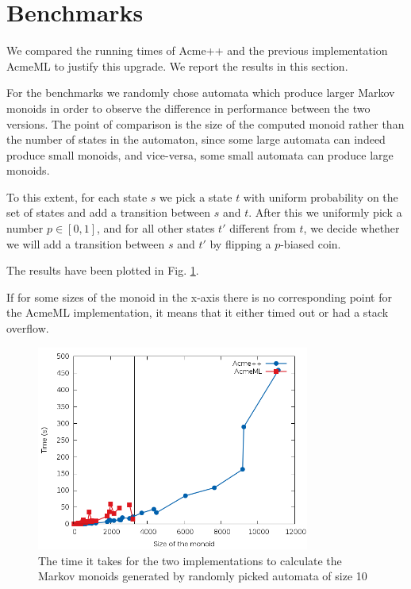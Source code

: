 \section{Benchmarks}
We compared the running times of Acme++ and the previous
implementation AcmeML to justify this upgrade. We report the results
in this section.

For the benchmarks we randomly chose automata which produce larger
Markov monoids in order to observe the difference in performance
between the two versions. The point of comparison is the size of the
computed monoid rather than the number of states in the automaton,
since some large automata can indeed produce small monoids, and
vice-versa, some small automata can produce large monoids.

To this extent, for each state $s$ we pick a state $t$ with uniform
probability on the set of states and add a transition between $s$ and
$t$. After this we uniformly pick a number $p\in[0,1]$, and for all
other states $t'$ different from $t$, we decide whether we will add a
transition between $s$ and $t'$ by flipping a $p$-biased coin.

The results have been plotted in Fig. \ref{bench1}. 

If for some sizes of the monoid in the x-axis there is no
corresponding point for the AcmeML implementation, it means that it
either timed out or had a stack overflow.

\begin{figure}[h!]
  \label{bench1}
  \begin{center}
    \includegraphics[width=0.8\textwidth]{graph/lines}
    \caption{The time it takes for the two implementations to
      calculate the Markov monoids generated by randomly picked
      automata of size 10}
  \end{center}  
\end{figure}


